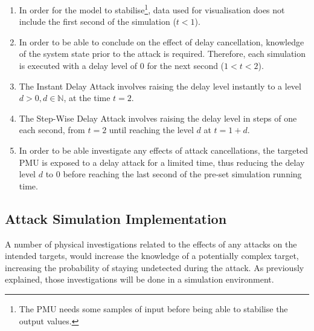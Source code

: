 \begin{enumerate}
\item In order for the model to stabilise\footnote{The PMU needs some samples of input before being able to stabilise the output values.}, data used for visualisation does not include the first second of the simulation ($t < 1$).
\item In order to be able to conclude on the effect of delay cancellation, knowledge of the system state prior to the attack is required. Therefore, each simulation is executed  with a delay level of 0 for the next second ($1 < t < 2$). 
\item  The Instant Delay Attack involves raising the delay level instantly to a level $d > 0,  d \in \mathbb{N}$, at the time $t = 2$.
\item  The Step-Wise Delay Attack involves raising the delay level in steps of one each second, from $t = 2$ until reaching the level $d$ at $t = 1+d$.  
\item  In order to be able investigate any effects of attack cancellations, the targeted PMU is exposed to a delay attack for a limited time, thus reducing the delay level $d$ to $0$ before reaching the last second of the pre-set simulation running time.   
\end{enumerate}
    


\subsection{Attack Simulation Implementation}








A number of physical investigations related to the effects of any attacks on the intended targets, would increase the knowledge of a potentially complex target, increasing the probability of staying undetected during the attack. As previously explained, those investigations will be done in a simulation environment.


